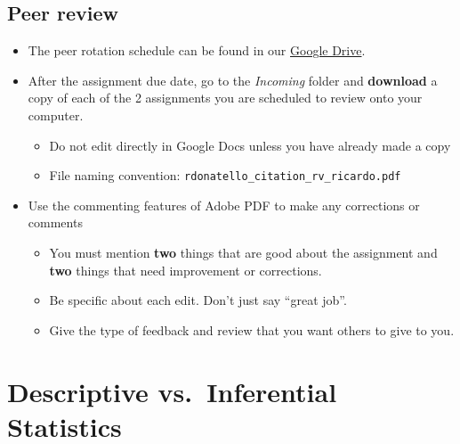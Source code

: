 \documentclass[]{article}
\providecommand{\tightlist}{%
  \setlength{\itemsep}{0pt}\setlength{\parskip}{0pt}}
\begin{document}
\subsection{Peer review}\label{peer-review}

\begin{itemize}
\tightlist
\item
  The peer rotation schedule can be found in our
  \href{https://drive.google.com/open?id=0B2-FPH8JVeuebFpnV3RZaU9KbTg}{Google
  Drive}.
\item
  After the assignment due date, go to the \emph{Incoming} folder and
  \textbf{download} a copy of each of the 2 assignments you are
  scheduled to review onto your computer.

  \begin{itemize}
  \tightlist
  \item
    Do not edit directly in Google Docs unless you have already made a
    copy
  \item
    File naming convention:
    \texttt{rdonatello\_citation\_rv\_ricardo.pdf}
  \end{itemize}
\item
  Use the commenting features of Adobe PDF to make any corrections or
  comments

  \begin{itemize}
  \tightlist
  \item
    You must mention \textbf{two} things that are good about the
    assignment and \textbf{two} things that need improvement or
    corrections.
  \item
    Be specific about each edit. Don't just say ``great job''.
  \item
    Give the type of feedback and review that you want others to give to
    you.
  \end{itemize}
\end{itemize}

\section{Descriptive vs.~Inferential
Statistics}\label{descriptive-vs.inferential-statistics}
\end{document}
